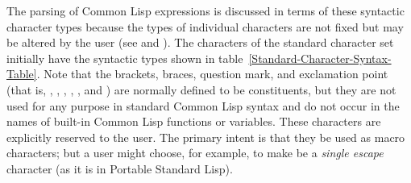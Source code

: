 The parsing of Common Lisp expressions is discussed in terms of these
syntactic character types because the types of individual characters
are not fixed
but may be altered by the user (see 
and ).
The characters of the standard character set initially have the
syntactic types shown in table~\ref{Standard-Character-Syntax-Table}.
Note that
the brackets, braces, question mark, and exclamation point
(that is, \cd{{\Xlbracket}}, \cd{{\Xrbracket}}, \cd{{\Xlbrace}},
\cd{{\Xrbrace}}, ,
and \cd{!}) are normally defined to be constituents, but they
are not used for any purpose in standard Common Lisp syntax and do not occur
in the names of built-in Common Lisp functions or variables.
These characters are explicitly reserved to the user.
The primary intent
is that they be used as macro characters; but a user might choose,
for example, to make \cd{!} be a \emph{single escape} character
(as it is in Portable Standard Lisp).

